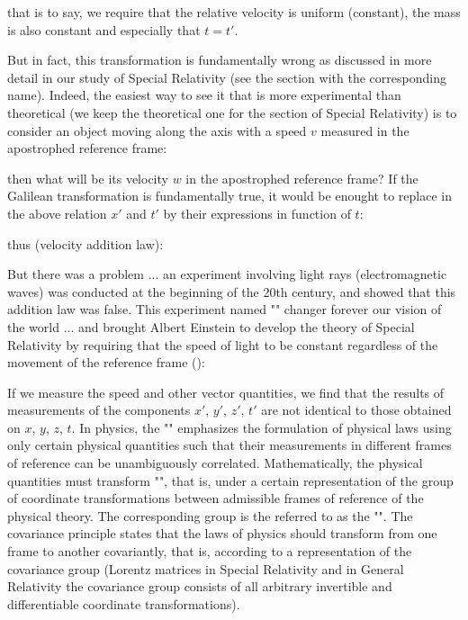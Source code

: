 	that is to say, we require that the relative velocity is uniform (constant), the mass is also constant and especially that $t=t'$.
	
	But in fact, this transformation is fundamentally wrong as discussed in more detail in our study of Special Relativity (see the section with the corresponding name). Indeed, the easiest way to see it that is more experimental than theoretical (we keep the theoretical one for the section of Special Relativity) is to consider an object moving along the axis with a speed $v$ measured in the apostrophed reference frame:
	
	then what will be its velocity $w$ in the apostrophed reference frame? If the Galilean transformation is fundamentally true, it would be enought to replace in the above relation $x'$ and $t'$ by their expressions in function of $t$:
	
	thus (velocity addition law):
	
	But there was a  problem ... an experiment involving light rays (electromagnetic waves) was conducted at the beginning of the 20th century, and showed that this addition law was false. This experiment named "" changer forever our vision of the world ... and brought Albert Einstein to develop the theory of Special Relativity by requiring that the speed of light to be constant regardless of the movement of the reference frame ():
	
	If we measure the speed and other vector quantities, we find that the results of measurements of the components $x '$, $y'$, $z '$, $t'$ are not identical to those obtained on $x$, $y$, $z$, $t$. In physics, the "" emphasizes the formulation of physical laws using only certain physical quantities such that their measurements in different frames of reference can be unambiguously correlated. Mathematically, the physical quantities must transform "", that is, under a certain representation of the group of coordinate transformations between admissible frames of reference of the physical theory. The corresponding group is the referred to as the "". The covariance principle states that the laws of physics should transform from one frame to another covariantly, that is, according to a representation of the covariance group (Lorentz matrices in Special Relativity and in General Relativity the covariance group consists of all arbitrary invertible and differentiable coordinate transformations).
	
